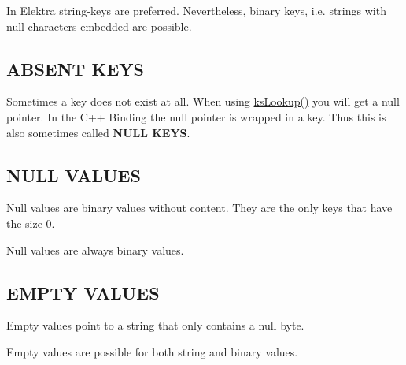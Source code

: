 In Elektra string-\/keys are preferred. Nevertheless, binary keys, i.\+e. strings with null-\/characters embedded are possible.

\subsection*{A\+B\+S\+E\+NT K\+E\+YS}

Sometimes a key does not exist at all. When using \hyperlink{group__keyset_gaa34fc43a081e6b01e4120daa6c112004}{ks\+Lookup()} you will get a null pointer. In the C++ Binding the null pointer is wrapped in a key. Thus this is also sometimes called {\bfseries N\+U\+LL K\+E\+YS}.

\subsection*{N\+U\+LL V\+A\+L\+U\+ES}

Null values are binary values without content. They are the only keys that have the size 0.

Null values are always binary values.

\subsection*{E\+M\+P\+TY V\+A\+L\+U\+ES}

Empty values point to a string that only contains a null byte.

Empty values are possible for both string and binary values. 